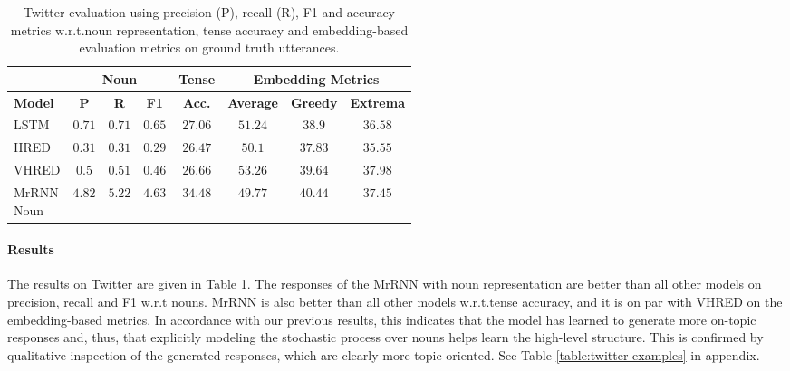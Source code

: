 \documentclass{article}
\begin{document}
\begin{table}[t]
  \caption{Twitter evaluation using precision (P), recall (R), F1 and accuracy metrics w.r.t.\@ noun representation, tense accuracy and embedding-based evaluation metrics on ground truth utterances.} \label{table:TwitterResults}
  \small
  \centering
    \begin{tabular}{lccccccc}
    \toprule
     & \multicolumn{3}{c}{\textbf{Noun}} & \textbf{Tense} & \multicolumn{3}{c}{\textbf{Embedding Metrics}} \\ \midrule
    \textbf{Model} & \textbf{P\@} & \textbf{R\@} & \textbf{F1} & \textbf{Acc.\@} & \textbf{Average} & \textbf{Greedy} & \textbf{Extrema} \\
    \midrule
        \parbox[c][2.65em][c]{0.085\textwidth}{LSTM} & $0.71$ & $0.71$ & $0.65$ & $27.06$ & $51.24$ & $38.9$ & $36.58$ \\
        \parbox[c][2.65em][c]{0.085\textwidth}{HRED} & $0.31$ & $0.31$ & $0.29$ & $26.47$ & $50.1$ & $37.83$ & $35.55$ \\
        \parbox[c][2.65em][c]{0.085\textwidth}{VHRED} & $0.5$ & $0.51$ & $0.46$ & $26.66$ & $\mathbf{53.26}$ & $39.64$ & $\mathbf{37.98}$ \\       
        \parbox[c][2.65em][c]{0.085\textwidth}{MrRNN \\ Noun} & $\mathbf{4.82}$ & $\mathbf{5.22}$ & $\mathbf{4.63}$ & $\mathbf{34.48}$ & $49.77$ & $\mathbf{40.44}$ & $37.45$ \\ \bottomrule
    \end{tabular}
\end{table}






\paragraph{Results} 

The results on Twitter are given in Table \ref{table:TwitterResults}.
The responses of the MrRNN with noun representation are better than all other models on precision, recall and F1 w.r.t nouns.
MrRNN is also better than all other models w.r.t.\@ tense accuracy, and it is on par with VHRED on the embedding-based metrics.
In accordance with our previous results, this indicates that the model has learned to generate more on-topic responses and, thus, that explicitly modeling the stochastic process over nouns helps learn the high-level structure.
This is confirmed by qualitative inspection of the generated responses,
which are clearly more topic-oriented. 
See Table \ref{table:twitter-examples} in appendix.
\end{document}
